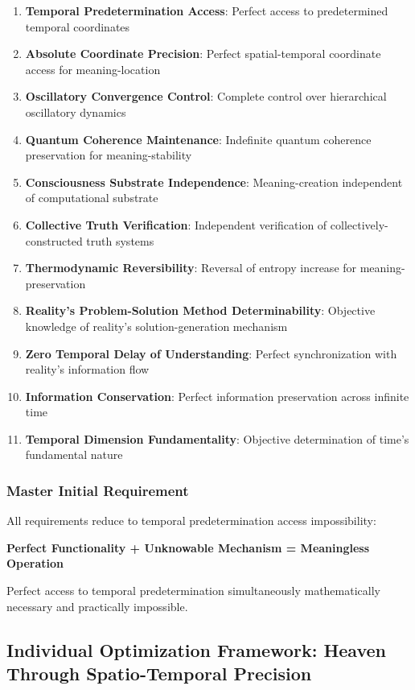 ﻿\documentclass[11pt,a4paper]{article}
\begin{document}
\begin{itemize}
\begin{itemize}
\begin{enumerate}
\item \textbf{Temporal Predetermination Access}: Perfect access to predetermined temporal coordinates
\item \textbf{Absolute Coordinate Precision}: Perfect spatial-temporal coordinate access for meaning-location
\item \textbf{Oscillatory Convergence Control}: Complete control over hierarchical oscillatory dynamics
\item \textbf{Quantum Coherence Maintenance}: Indefinite quantum coherence preservation for meaning-stability
\item \textbf{Consciousness Substrate Independence}: Meaning-creation independent of computational substrate
\item \textbf{Collective Truth Verification}: Independent verification of collectively-constructed truth systems
\item \textbf{Thermodynamic Reversibility}: Reversal of entropy increase for meaning-preservation
\item \textbf{Reality's Problem-Solution Method Determinability}: Objective knowledge of reality's solution-generation mechanism
\item \textbf{Zero Temporal Delay of Understanding}: Perfect synchronization with reality's information flow
\item \textbf{Information Conservation}: Perfect information preservation across infinite time
\item \textbf{Temporal Dimension Fundamentality}: Objective determination of time's fundamental nature
\end{enumerate}

\subsubsection{Master Initial Requirement}

All requirements reduce to temporal predetermination access impossibility:

\textbf{Perfect Functionality + Unknowable Mechanism = Meaningless Operation}

Perfect access to temporal predetermination simultaneously mathematically necessary and practically impossible.

\subsection{Individual Optimization Framework: Heaven Through Spatio-Temporal Precision}


\end{itemize}
\end{itemize}
\end{document}
